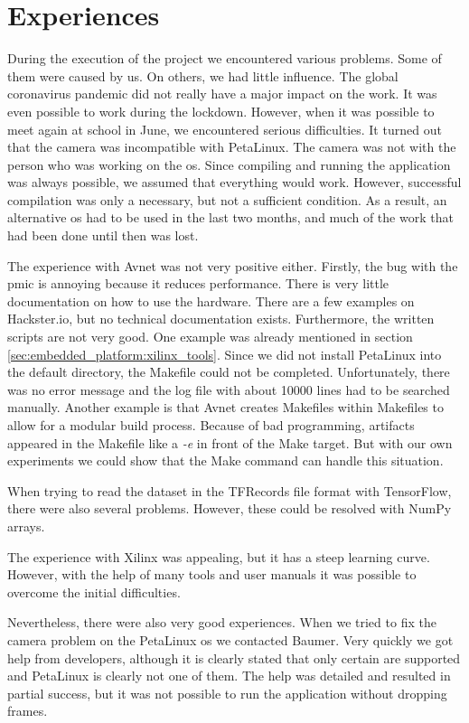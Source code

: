 \chapter*{Experiences}
\label{ch:experiences}

During the execution of the project we encountered various problems.
Some of them were caused by us.
On others, we had little influence.
The global coronavirus pandemic did not really have a major impact on the work.
It was even possible to work during the lockdown.
However, when it was possible to meet again at school in June, we encountered serious difficulties.
It turned out that the camera was incompatible with PetaLinux.
The camera was not with the person who was working on the \acrlong{os}.
Since compiling and running the application was always possible, we assumed that everything would work.
However, successful compilation was only a necessary, but not a sufficient condition.
As a result, an alternative \acrlong{os} had to be used in the last two months, and much of the work that had been done until then was lost.

The experience with Avnet was not very positive either.
Firstly, the bug with the \acrshort{pmic} is annoying because it reduces performance.
There is very little documentation on how to use the hardware.
There are a few examples on Hackster.io, but no technical documentation exists.
Furthermore, the written scripts are not very good.
One example was already mentioned in section \ref{sec:embedded_platform:xilinx_tools}.
Since we did not install PetaLinux into the default directory, the Makefile could not be completed.
Unfortunately, there was no error message and the log file with about \num{10000} lines had to be searched manually.
Another example is that Avnet creates Makefiles within Makefiles to allow for a modular build process.
Because of bad programming, artifacts appeared in the Makefile like a \textit{-e} in front of the Make target.
But with our own experiments we could show that the Make command can handle this situation.

When trying to read the dataset in the TFRecords file format with TensorFlow, there were also several problems.
However, these could be resolved with NumPy arrays.

The experience with Xilinx was appealing, but it has a steep learning curve.
However, with the help of many tools and user manuals it was possible to overcome the initial difficulties.

Nevertheless, there were also very good experiences.
When we tried to fix the camera problem on the PetaLinux \acrshort{os} we contacted Baumer.
Very quickly we got help from developers, although it is clearly stated that only certain  are supported and PetaLinux is clearly not one of them.
The help was detailed and resulted in partial success, but it was not possible to run the application without dropping frames.

